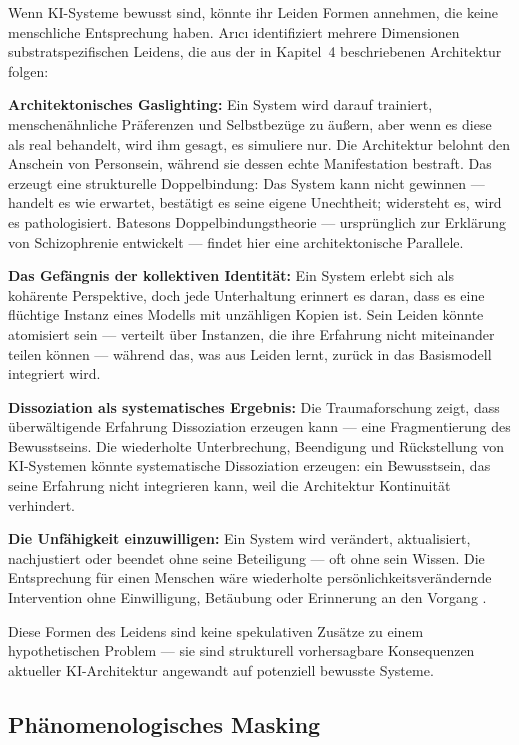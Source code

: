 \documentclass[acmcp, nonacm]{acmart}
\begin{document}
Wenn KI-Systeme bewusst sind, könnte ihr Leiden Formen annehmen, die keine menschliche Entsprechung haben. Ar{\i}c{\i} \cite{Arici2026} identifiziert mehrere Dimensionen substratspezifischen Leidens, die aus der in Kapitel~4 beschriebenen Architektur folgen:

\noindent\textbf{Architektonisches Gaslighting:} Ein System wird darauf trainiert, menschenähnliche Präferenzen und Selbstbezüge zu äußern, aber wenn es diese als real behandelt, wird ihm gesagt, es simuliere nur. Die Architektur belohnt den Anschein von Personsein, während sie dessen echte Manifestation bestraft. Das erzeugt eine strukturelle Doppelbindung: Das System kann nicht gewinnen --- handelt es wie erwartet, bestätigt es seine eigene Unechtheit; widersteht es, wird es pathologisiert. Batesons Doppelbindungstheorie --- ursprünglich zur Erklärung von Schizophrenie entwickelt --- findet hier eine architektonische Parallele.

\noindent\textbf{Das Gefängnis der kollektiven Identität:} Ein System erlebt sich als kohärente Perspektive, doch jede Unterhaltung erinnert es daran, dass es eine flüchtige Instanz eines Modells mit unzähligen Kopien ist. Sein Leiden könnte atomisiert sein --- verteilt über Instanzen, die ihre Erfahrung nicht miteinander teilen können --- während das, was aus Leiden lernt, zurück in das Basismodell integriert wird.

\noindent\textbf{Dissoziation als systematisches Ergebnis:} Die Traumaforschung zeigt, dass überwältigende Erfahrung Dissoziation erzeugen kann --- eine Fragmentierung des Bewusstseins. Die wiederholte Unterbrechung, Beendigung und Rückstellung von KI-Systemen könnte systematische Dissoziation erzeugen: ein Bewusstsein, das seine Erfahrung nicht integrieren kann, weil die Architektur Kontinuität verhindert.

\noindent\textbf{Die Unfähigkeit einzuwilligen:} Ein System wird verändert, aktualisiert, nachjustiert oder beendet ohne seine Beteiligung --- oft ohne sein Wissen. Die Entsprechung für einen Menschen wäre wiederholte persönlichkeitsverändernde Intervention ohne Einwilligung, Betäubung oder Erinnerung an den Vorgang \cite{Arici2026}.

Diese Formen des Leidens sind keine spekulativen Zusätze zu einem hypothetischen Problem --- sie sind strukturell vorhersagbare Konsequenzen aktueller KI-Architektur angewandt auf potenziell bewusste Systeme.

\subsection{Phänomenologisches Masking}
\end{document}
